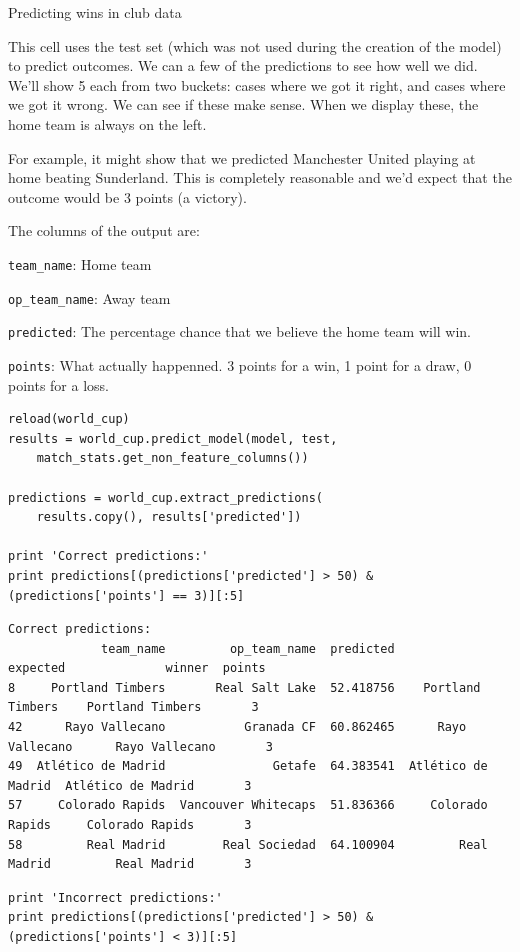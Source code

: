 \documentclass[12pt,fleqn]{article}\usepackage{common}
\begin{document}
Predicting wins in club data

This cell uses the test set (which was not used during the creation of the
model) to predict outcomes. We can a few of the predictions to see how well
we did. We'll show 5 each from two buckets: cases where we got it right,
and cases where we got it wrong. We can see if these make sense. When we
display these, the home team is always on the left.

For example, it might show that we predicted Manchester United playing at
home beating Sunderland. This is completely reasonable and we'd expect that
the outcome would be 3 points (a victory).

The columns of the output are:

\verb!team_name!: Home team

\verb!op_team_name!: Away team

\verb!predicted!: The percentage chance that we believe the home team will win.

\verb!points!: What actually happenned. 3 points for a win, 1 point for a draw, 0
points for a loss. 

\begin{verbatim}
reload(world_cup)
results = world_cup.predict_model(model, test, 
    match_stats.get_non_feature_columns())

predictions = world_cup.extract_predictions(
    results.copy(), results['predicted'])

print 'Correct predictions:'
print predictions[(predictions['predicted'] > 50) & (predictions['points'] == 3)][:5]
\end{verbatim}

\begin{verbatim}
Correct predictions:
             team_name         op_team_name  predicted            expected              winner  points
8     Portland Timbers       Real Salt Lake  52.418756    Portland Timbers    Portland Timbers       3
42      Rayo Vallecano           Granada CF  60.862465      Rayo Vallecano      Rayo Vallecano       3
49  Atlético de Madrid               Getafe  64.383541  Atlético de Madrid  Atlético de Madrid       3
57     Colorado Rapids  Vancouver Whitecaps  51.836366     Colorado Rapids     Colorado Rapids       3
58         Real Madrid        Real Sociedad  64.100904         Real Madrid         Real Madrid       3
\end{verbatim}

\begin{verbatim}
print 'Incorrect predictions:'
print predictions[(predictions['predicted'] > 50) & (predictions['points'] < 3)][:5]
\end{verbatim}
\end{document}
